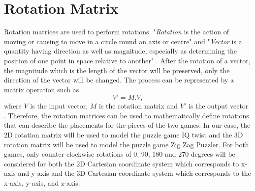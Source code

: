 \section{Rotation Matrix}
Rotation matrices are used to perform rotations. "\emph{Rotation} is the action of moving or causing to move in a circle round an axis or centre" and "\emph{Vector} is a quantity having direction as well as magnitude, especially as determining the position of one point in space relative to another" \cite{r14}. After the rotation of a vector, the magnitude which is the length of the vector will be preserved, only the direction of the vector will be changed. The process can be represented by a matrix operation such as 
\begin{equation}
V'=M.V,
\end{equation}
where $V$ is the input vector, $M$ is the rotation matrix and $V'$ is the output vector \cite{r15}. Therefore, the rotation matrices can be used to mathematically define rotations that can describe the placements for the pieces of the two games. In our case, the 2D rotation matrix will be used to model the puzzle game IQ twist and the 3D rotation matrix will be used to model the puzzle game Zig Zag Puzzler. For both games, only counter-clockwise rotations of 0, 90, 180 and 270 degrees will be considered for both the 2D Cartesian coordinate system which corresponds to x-axis and y-axis and the 3D Cartesian coordinate system which corresponds to the x-axis, y-axis, and z-axis.
